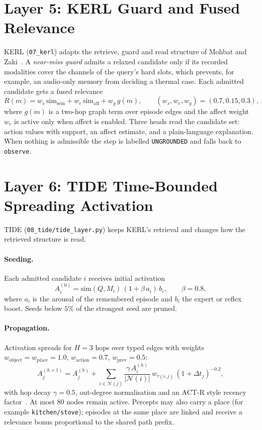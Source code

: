 \documentclass[12pt,a4paper,oneside]{report}
\newcommand{\code}[1]{\texttt{\small #1}}
\begin{document}
\section{Layer 5: KERL Guard and Fused Relevance}
KERL (\code{07\_kerl}) adapts the retrieve, guard and read structure of Mohbat and Zaki~\cite{mohbat2025}. A \emph{near-miss guard} admits a relaxed candidate only if its recorded modalities cover the channels of the query's hard slots, which prevents, for example, an audio-only memory from deciding a thermal case. Each admitted candidate gets a fused relevance
\begin{equation}
  R(m) = w_s\,\mathrm{sim}_{\text{sem}} + w_e\,\mathrm{sim}_{\text{aff}} + w_g\,g(m), \qquad (w_s, w_e, w_g) = (0.7, 0.15, 0.3),
\end{equation}
where $g(m)$ is a two-hop graph term over episode edges and the affect weight $w_e$ is active only when affect is enabled. Three heads read the candidate set: action values with support, an affect estimate, and a plain-language explanation. When nothing is admissible the step is labelled \code{UNGROUNDED} and falls back to \code{observe}.

\section{Layer 6: TIDE Time-Bounded Spreading Activation}\label{sec:tide}
TIDE (\code{08\_tide/tide\_layer.py}) keeps KERL's retrieval and changes how the retrieved structure is read.

\paragraph{Seeding.} Each admitted candidate $i$ receives initial activation
\begin{equation}
  A_i^{(0)} = \mathrm{sim}(Q, M_i)\,(1 + \beta\,a_i)\,b_i, \qquad \beta = 0.8,
\end{equation}
where $a_i$ is the arousal of the remembered episode and $b_i$ the expert or reflex boost. Seeds below $5\%$ of the strongest seed are pruned.

\paragraph{Propagation.} Activation spreads for $H = 3$ hops over typed edges with weights $w_{\text{object}} = w_{\text{place}} = 1.0$, $w_{\text{action}} = 0.7$, $w_{\text{prev}} = 0.5$:
\begin{equation}
  A_j^{(h+1)} = A_j^{(h)} + \sum_{i \in \mathcal{N}(j)} \frac{\gamma\, A_i^{(h)}}{|\mathcal{N}(i)|}\, w_{\tau(i,j)}\,(1 + \Delta t_j)^{-0.2},
\end{equation}
with hop decay $\gamma = 0.5$, out-degree normalisation and an ACT-R style recency factor~\cite{anderson2004}. At most 80 nodes remain active. Percepts may also carry a place (for example \code{kitchen/stove}); episodes at the same place are linked and receive a relevance bonus proportional to the shared path prefix.
\end{document}
